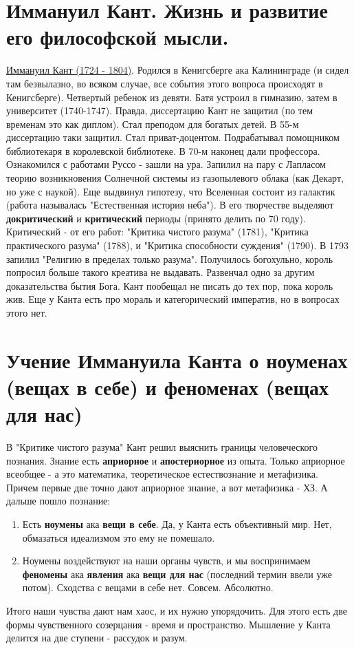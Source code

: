 \section{Иммануил Кант.  Жизнь и развитие его философской мысли.}
\underline{Иммануил Кант (1724 - 1804)}. Родился в Кенигсберге ака Калининграде (и сидел там безвылазно, во всяком случае, все события этого вопроса происходят в Кенигсберге). Четвертый ребенок из девяти. Батя устроил в гимназию, затем в университет (1740-1747). Правда, диссертацию Кант не защитил (по тем временам это как диплом). Стал преподом для богатых детей. В 55-м диссертацию таки защитил. Стал приват-доцентом. Подрабатывал помощником библиотекаря в королевской библиотеке. В 70-м наконец дали профессора. Ознакомился с работами Руссо - зашли на ура. Запилил на пару с Лапласом теорию возникновения Солнечной системы из газопылевого облака (как Декарт, но уже с наукой). Еще выдвинул гипотезу, что Вселенная состоит из галактик (работа называлась "Естественная история неба"). В его творчестве выделяют \textbf{докритический} и \textbf{критический} периоды (принято делить по 70 году). Критический - от его работ: "Критика чистого разума" (1781), "Критика практического разума" (1788), и "Критика способности суждения" (1790). В 1793 запилил "Религию в пределах только разума". Получилось богохульно, король попросил больше такого креатива не выдавать.  Развенчал одно за другим доказательства бытия Бога. Кант пообещал не писать до тех пор, пока король жив. Еще у Канта есть про мораль и категорический императив, но в вопросах этого нет. 

\section{Учение Иммануила Канта о ноуменах (вещах в себе) и феноменах (вещах для нас)}
В "Критике чистого разума" Кант решил выяснить границы человеческого познания. Знание есть \textbf{априорное} и \textbf{апостериорное} из опыта. Только априорное всеобщее - а это математика, теоретическое естествознание и метафизика. Причем первые две точно дают априорное знание, а вот метафизика - ХЗ. А дальше пошло познание:
\begin{enumerate}
\item Есть \textbf{ноумены} ака \textbf{вещи в себе}. Да, у Канта есть объективный мир. Нет, обмазаться идеализмом это ему не помешало.
\item Ноумены воздействуют на наши органы чувств, и мы воспринимаем \textbf{феномены} ака \textbf{явления} ака \textbf{вещи для нас} (последний термин ввели уже потом). Сходства с вещами в себе нет. Совсем. Абсолютно.
\end{enumerate} 
Итого наши чувства дают нам хаос, и их нужно упорядочить. Для этого есть две формы чувственного созерцания - время и пространство. Мышление у Канта делится на две ступени - рассудок и разум.


